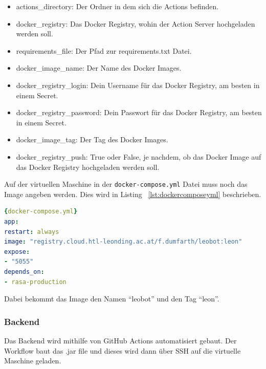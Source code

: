 \begin{itemize}
    \item actions\_directory: Der Ordner in dem sich die Actions befinden.
    \item docker\_registry: Das Docker Registry, wohin der Action Server hochgeladen werden soll.
    \item requirements\_file: Der Pfad zur requirements.txt Datei.
    \item docker\_image\_name: Der Name des Docker Images.
    \item docker\_registry\_login: Dein Username für das Docker Registry, am besten in einem Secret.
    \item docker\_registry\_password: Dein Passwort für das Docker Registry, am besten in einem Secret.
    \item docker\_image\_tag: Der Tag des Docker Images.
    \item docker\_registry\_push: True oder False, je nachdem, ob das Docker Image auf das Docker Registry hochgeladen werden soll.
\end{itemize}

Auf der virtuellen Maschine in der \texttt{docker-compose.yml} Datei muss noch das Image angeben werden.
Dies wird in Listing ~\ref{lst:dockercomposeyml} beschrieben.

\begin{lstlisting}[language=yaml,label={lst:dockercomposeyml},caption={docker-compose.yml}]{docker-compose.yml}
app:
restart: always
image: "registry.cloud.htl-leonding.ac.at/f.dumfarth/leobot:leon"
expose:
- "5055"
depends_on:
- rasa-production
\end{lstlisting}

Dabei bekommt das Image den Namen ``leobot'' und den Tag ``leon''.

\subsubsection{Backend}
Das Backend wird mithilfe von GitHub Actions automatisiert gebaut.
Der Workflow baut das .jar file und dieses wird dann über SSH auf die virtuelle Maschine geladen.

